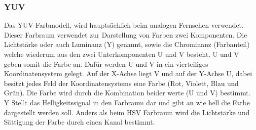 \documentclass[a4paper,12pt,oneside]{article}
\begin{document}
  \subsubsection{YUV}\label{s.lab}
Das YUV-Farbmodell, wird hauptsächlich beim analogen Fernsehen verwendet. Dieser Farbraum verwendet zur Darstellung von Farben zwei Komponenten. Die Lichtstärke oder auch Luminanz (Y) genannt, sowie die Chrominanz (Farbanteil) welche wiederum aus den zwei Unterkomponenten U und V besteht. U und V geben somit die Farbe an. Dafür werden U und V in ein vierteiliges Koordinatensystem gelegt. Auf der X-Achse liegt V und auf der Y-Achse U, dabei besitzt jedes Feld der Koordinatensystems eine Farbe (Rot, Violett, Blau und Grün). Die Farbe wird durch die Kombination beider werte (U und V) bestimmt. Y Stellt das Helligkeitssignal in den Farbraum dar und gibt an wie hell die Farbe dargestellt werden soll. Anders als beim HSV Farbraum wird die Lichtstärke und Sättigung der Farbe durch einen Kanal bestimmt. 
\end{document}
